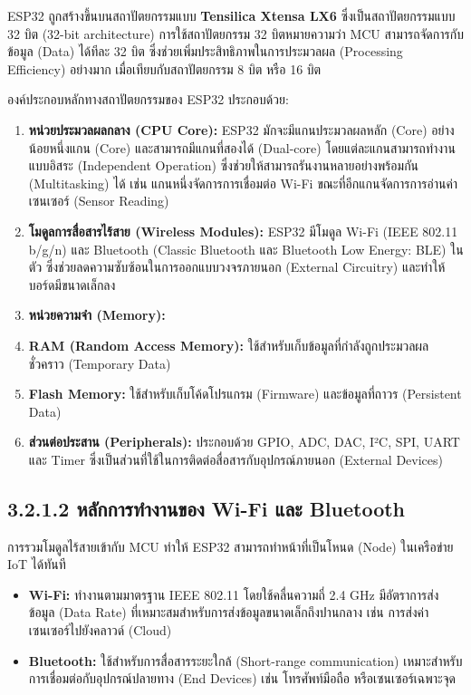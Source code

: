 \documentclass[11pt,a4paper,openany]{report}
\begin{document}
ESP32 ถูกสร้างขึ้นบนสถาปัตยกรรมแบบ \textbf{Tensilica Xtensa LX6} ซึ่งเป็นสถาปัตยกรรมแบบ 32 บิต (32-bit architecture) การใช้สถาปัตยกรรม 32 บิตหมายความว่า MCU สามารถจัดการกับข้อมูล (Data) ได้ทีละ 32 บิต ซึ่งช่วยเพิ่มประสิทธิภาพในการประมวลผล (Processing Efficiency) อย่างมาก เมื่อเทียบกับสถาปัตยกรรม 8 บิต หรือ 16 บิต

องค์ประกอบหลักทางสถาปัตยกรรมของ ESP32 ประกอบด้วย:

\begin{enumerate}
  \item \textbf{หน่วยประมวลผลกลาง (CPU Core):} ESP32 มักจะมีแกนประมวลผลหลัก (Core) อย่างน้อยหนึ่งแกน (Core) และสามารถมีแกนที่สองได้ (Dual-core) โดยแต่ละแกนสามารถทำงานแบบอิสระ (Independent Operation) ซึ่งช่วยให้สามารถรันงานหลายอย่างพร้อมกัน (Multitasking) ได้ เช่น แกนหนึ่งจัดการการเชื่อมต่อ Wi-Fi ขณะที่อีกแกนจัดการการอ่านค่าเซนเซอร์ (Sensor Reading)
  \item \textbf{โมดูลการสื่อสารไร้สาย (Wireless Modules):} ESP32 มีโมดูล Wi-Fi (IEEE 802.11 b/g/n) และ Bluetooth (Classic Bluetooth และ Bluetooth Low Energy: BLE) ในตัว ซึ่งช่วยลดความซับซ้อนในการออกแบบวงจรภายนอก (External Circuitry) และทำให้บอร์ดมีขนาดเล็กลง
  \item \textbf{หน่วยความจำ (Memory):}
  \item \textbf{RAM (Random Access Memory):} ใช้สำหรับเก็บข้อมูลที่กำลังถูกประมวลผลชั่วคราว (Temporary Data)
  \item \textbf{Flash Memory:} ใช้สำหรับเก็บโค้ดโปรแกรม (Firmware) และข้อมูลที่ถาวร (Persistent Data)
  \item \textbf{ส่วนต่อประสาน (Peripherals):} ประกอบด้วย GPIO, ADC, DAC, I²C, SPI, UART และ Timer ซึ่งเป็นส่วนที่ใช้ในการติดต่อสื่อสารกับอุปกรณ์ภายนอก (External Devices)
\end{enumerate}


\subsection{3.2.1.2 หลักการทำงานของ Wi-Fi และ Bluetooth}


การรวมโมดูลไร้สายเข้ากับ MCU ทำให้ ESP32 สามารถทำหน้าที่เป็นโหนด (Node) ในเครือข่าย IoT ได้ทันที

\begin{itemize}
  \item \textbf{Wi-Fi:} ทำงานตามมาตรฐาน IEEE 802.11 โดยใช้คลื่นความถี่ 2.4 GHz มีอัตราการส่งข้อมูล (Data Rate) ที่เหมาะสมสำหรับการส่งข้อมูลขนาดเล็กถึงปานกลาง เช่น การส่งค่าเซนเซอร์ไปยังคลาวด์ (Cloud)
  \item \textbf{Bluetooth:} ใช้สำหรับการสื่อสารระยะใกล้ (Short-range communication) เหมาะสำหรับการเชื่อมต่อกับอุปกรณ์ปลายทาง (End Devices) เช่น โทรศัพท์มือถือ หรือเซนเซอร์เฉพาะจุด
\end{itemize}
\end{document}
